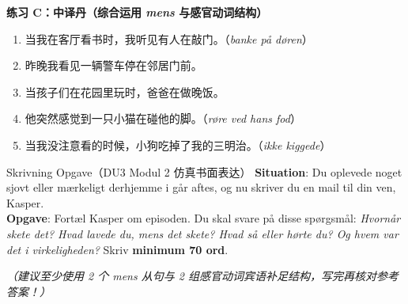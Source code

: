 \textbf{练习 C：中译丹（综合运用 \textit{mens} 与感官动词结构）}
\begin{enumerate}
  \item 当我在客厅看书时，我听见有人在敲门。（\textit{banke på døren}）
  \item 昨晚我看见一辆警车停在邻居门前。
  \item 当孩子们在花园里玩时，爸爸在做晚饭。
  \item 他突然感觉到一只小猫在碰他的脚。（\textit{røre ved hans fod}）
  \item 当我没注意看的时候，小狗吃掉了我的三明治。（\textit{ikke kiggede}）
\end{enumerate}


\begin{emailbox}{Skrivning Opgave（DU3 Modul 2 仿真书面表达）}
\textbf{Situation}: Du oplevede noget sjovt eller mærkeligt derhjemme i går aftes, og nu skriver du en mail til din ven, Kasper.\\
\textbf{Opgave}: Fortæl Kasper om episoden. Du skal svare på disse spørgsmål: \textit{Hvornår skete det? Hvad lavede du, mens det skete? Hvad så eller hørte du? Og hvem var det i virkeligheden?} Skriv \textbf{minimum 70 ord}.
\end{emailbox}

\textit{（建议至少使用 2 个 \textit{mens} 从句与 2 组感官动词宾语补足结构，写完再核对参考答案！）}


